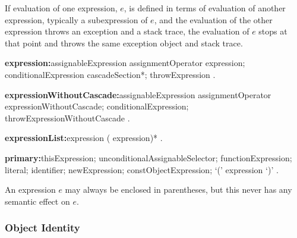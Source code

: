 \documentclass{article}
\begin{document}
\LMHash{}
If evaluation of one expression, $e$, is defined in terms of evaluation of another expression, typically a subexpression of $e$,
and the evaluation of the other expression throws an exception and a stack trace,
the evaluation of $e$ stops at that point and throws the same exception object and stack trace.

\begin{grammar}
{\bf expression:}assignableExpression assignmentOperator expression;
  conditionalExpression cascadeSection*;
  throwExpression
  .

{\bf expressionWithoutCascade:}assignableExpression assignmentOperator
  \gnewline{} expressionWithoutCascade;
  conditionalExpression;
  throwExpressionWithoutCascade
  .

{\bf expressionList:}expression (\gcomma{} expression)*
  .
\end{grammar}

\begin{grammar}
{\bf primary:}thisExpression;
  \SUPER{} unconditionalAssignableSelector;
  functionExpression;
  literal;
  identifier;
  newExpression;
  constObjectExpression;
  `(' expression `)'
  .
\end{grammar}

\LMHash{}
An expression $e$ may always be enclosed in parentheses, but this never has any semantic effect on $e$.



\subsubsection{Object Identity}
\end{document}
